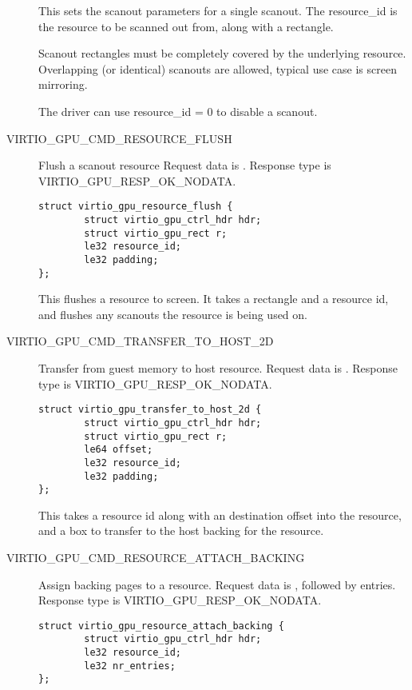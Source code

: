 \begin{description}
This sets the scanout parameters for a single scanout. The resource_id
is the resource to be scanned out from, along with a rectangle.

Scanout rectangles must be completely covered by the underlying
resource.  Overlapping (or identical) scanouts are allowed, typical
use case is screen mirroring.

The driver can use resource_id = 0 to disable a scanout.

\item[VIRTIO_GPU_CMD_RESOURCE_FLUSH] Flush a scanout resource Request
  data is .  Response type is
  VIRTIO_GPU_RESP_OK_NODATA.

\begin{lstlisting}
struct virtio_gpu_resource_flush {
        struct virtio_gpu_ctrl_hdr hdr;
        struct virtio_gpu_rect r;
        le32 resource_id;
        le32 padding;
};
\end{lstlisting}

This flushes a resource to screen.  It takes a rectangle and a
resource id, and flushes any scanouts the resource is being used on.

\item[VIRTIO_GPU_CMD_TRANSFER_TO_HOST_2D] Transfer from guest memory
  to host resource.  Request data is .  Response type is
  VIRTIO_GPU_RESP_OK_NODATA.

\begin{lstlisting}
struct virtio_gpu_transfer_to_host_2d {
        struct virtio_gpu_ctrl_hdr hdr;
        struct virtio_gpu_rect r;
        le64 offset;
        le32 resource_id;
        le32 padding;
};
\end{lstlisting}

This takes a resource id along with an destination offset into the
resource, and a box to transfer to the host backing for the resource.

\item[VIRTIO_GPU_CMD_RESOURCE_ATTACH_BACKING] Assign backing pages to
  a resource.  Request data is , followed by  entries.  Response type is
  VIRTIO_GPU_RESP_OK_NODATA.

\begin{lstlisting}
struct virtio_gpu_resource_attach_backing {
        struct virtio_gpu_ctrl_hdr hdr;
        le32 resource_id;
        le32 nr_entries;
};


\end{lstlisting}
\end{description}
